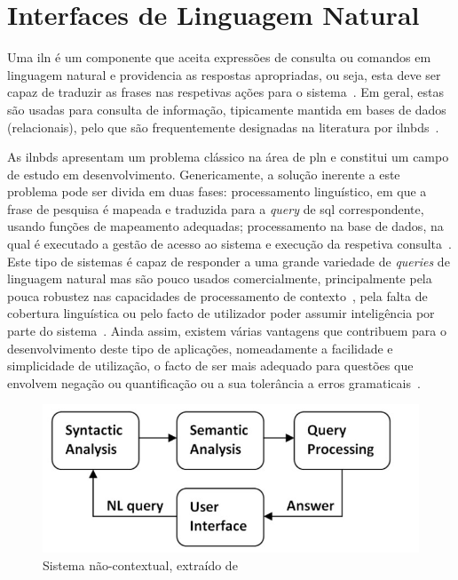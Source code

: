 \section{Interfaces de Linguagem Natural}
\label{sec:chap03_nli}
Uma \gls{iln} é um componente que aceita expressões de consulta ou comandos em linguagem natural e providencia as respostas apropriadas, ou seja, esta deve ser capaz de traduzir as frases nas respetivas ações para o sistema~\parencite{nlp}. Em geral, estas são usadas para consulta de informação, tipicamente mantida em bases de dados (relacionais), pelo que são frequentemente designadas na literatura por \glspl{ilnbd}~\parencite{overview_nlidb_approaches_implementation_airline, novel_approach_building_generic_portable_contextual_nlidb_system}.

As \glspl{ilnbd} apresentam um problema clássico na área de \gls{pln} e constitui um campo de estudo em desenvolvimento. Genericamente, a solução inerente a este problema pode ser divida em duas fases: processamento linguístico, em que a frase de pesquisa é mapeada e traduzida para a \textit{query} de \gls{sql} correspondente, usando funções de mapeamento adequadas; processamento na base de dados, na qual é executado a gestão de acesso ao sistema e execução da respetiva consulta~\parencite{overview_nlidb_approaches_implementation_airline}. Este tipo de sistemas é capaz de responder a uma grande variedade de \textit{queries} de linguagem natural mas são pouco usados comercialmente, principalmente pela pouca robustez nas capacidades de processamento de contexto~\parencite{novel_approach_towards_incorporating_context_processing_nlidb}, pela falta de cobertura linguística ou pelo facto de utilizador poder assumir inteligência por parte do sistema~\parencite{survey_nlidb, overview_nlidb_approaches_implementation_airline}. Ainda assim, existem várias vantagens que contribuem para o desenvolvimento deste tipo de aplicações, nomeadamente a facilidade e simplicidade de utilização, o facto de ser mais adequado para questões que envolvem negação ou quantificação ou a sua tolerância a erros gramaticais~\parencite{survey_nlidb, nlidb_brief_review, overview_nlidb_approaches_implementation_airline}.
%
\begin{figure}[!ht]
    \centering
    \includegraphics[width=.6\textwidth]{ch03/assets/non_contextual_nlidb.jpg}
    \caption{Sistema não-contextual, extraído de~\textcite{novel_approach_towards_incorporating_context_processing_nlidb}}
    \label{fig:noncontextual_nlidb}
\end{figure}

